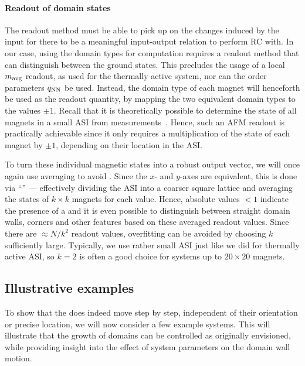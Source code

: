 \paragraph{Readout of domain states}
The readout method must be able to pick up on the changes induced by the input for there to be a meaningful input-output relation to perform RC with.
In our case, using the domain types for computation requires a readout method that can distinguish between the ground states.
This precludes the usage of a local $m_\mathrm{avg}$ readout, as used for the thermally active system, nor can the order parameters $q_\mathrm{NN}$ be used.
Instead, the domain type of each magnet will henceforth be used as the readout quantity, by mapping the two equivalent domain types to the values $\pm 1$.
Recall that it is theoretically possible to determine the state of all magnets in a small ASI from  measurements~\cite[Supp. 7]{KUR-24}.
Hence, such an AFM readout is practically achievable since it only requires a multiplication of the state of each magnet by $\pm 1$, depending on their location in the ASI. \par
To turn these individual magnetic states into a robust output vector, we will once again use averaging to avoid .
Since the $x$- and $y$-axes are equivalent, this is done via ``'' --- effectively dividing the ASI into a coarser square lattice and averaging the states of $k \times k$ magnets for each  value.
Hence, absolute values $<1$ indicate the presence of a  and it is even possible to distinguish between straight domain walls, corners and other features based on these averaged readout values.
Since there are $\approx N/k^2$ readout values, overfitting can be avoided by choosing $k$ sufficiently large.
Typically, we use rather small ASI just like we did for thermally active ASI, so $k=2$ is often a good choice for systems up to $20 \times 20$ magnets.

\subsection{Illustrative examples}
To show that the  does indeed move  step by step, independent of their orientation or precise location, we will now consider a few example systems.
This will illustrate that the growth of domains can be controlled as originally envisioned, while providing insight into the effect of system parameters on the domain wall motion.


